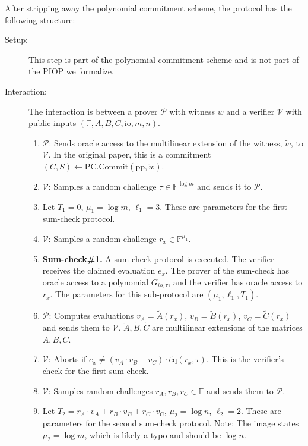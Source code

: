 After stripping away the polynomial commitment scheme, the protocol has the following structure:

\begin{description}
    \item[Setup:] This step is part of the polynomial commitment scheme and is not part of the PIOP we formalize.
    \item[Interaction:] The interaction is between a prover $\mathcal{P}$ with witness $w$ and a verifier $\mathcal{V}$ with public inputs $(\mathbb{F}, A, B, C, \text{io}, m, n)$.
    \begin{enumerate}
        \item $\mathcal{P}$: Sends oracle access to the multilinear extension of the witness, $\tilde{w}$, to $\mathcal{V}$. In the original paper, this is a commitment $(C,S) \leftarrow \text{PC.Commit}(\text{pp}, \tilde{w})$.
        \item $\mathcal{V}$: Samples a random challenge $\tau \in \mathbb{F}^{\log m}$ and sends it to $\mathcal{P}$.
        \item Let $T_1 = 0$, $\mu_1 = \log m$, $\ell_1 = 3$. These are parameters for the first sum-check protocol.
        \item $\mathcal{V}$: Samples a random challenge $r_x \in \mathbb{F}^{\mu_1}$.
        \item \textbf{Sum-check\#1.} A sum-check protocol is executed. The verifier receives the claimed evaluation $e_x$. The prover of the sum-check has oracle access to a polynomial $G_{io, \tau}$, and the verifier has oracle access to $r_x$. The parameters for this sub-protocol are $(\mu_1, \ell_1, T_1)$.
        \item $\mathcal{P}$: Computes evaluations $v_A = \tilde{A}(r_x)$, $v_B = \tilde{B}(r_x)$, $v_C = \tilde{C}(r_x)$ and sends them to $\mathcal{V}$. $\tilde{A}, \tilde{B}, \tilde{C}$ are multilinear extensions of the matrices $A, B, C$.
        \item $\mathcal{V}$: Aborts if $e_x \neq (v_A \cdot v_B - v_C) \cdot \tilde{\text{eq}}(r_x, \tau)$. This is the verifier's check for the first sum-check.
        \item $\mathcal{V}$: Samples random challenges $r_A, r_B, r_C \in \mathbb{F}$ and sends them to $\mathcal{P}$.
        \item Let $T_2 = r_A \cdot v_A + r_B \cdot v_B + r_C \cdot v_C$, $\mu_2 = \log n$, $\ell_2 = 2$. These are parameters for the second sum-check protocol. Note: The image states $\mu_2 = \log m$, which is likely a typo and should be $\log n$.

\end{enumerate}
\end{description}
